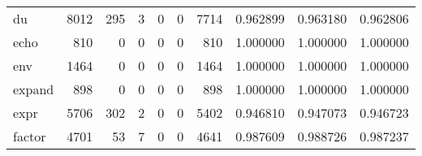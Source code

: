 \begin{tabular}{lrrrrrrrrr}
du        &                                8012 &                                             295 &                                              3 &                                             0 &                                              0 &                                         7714 &                                           0.962899 &                               0.963180 &                             0.962806 \\
echo      &                                 810 &                                               0 &                                              0 &                                             0 &                                              0 &                                          810 &                                           1.000000 &                               1.000000 &                             1.000000 \\
env       &                                1464 &                                               0 &                                              0 &                                             0 &                                              0 &                                         1464 &                                           1.000000 &                               1.000000 &                             1.000000 \\
expand    &                                 898 &                                               0 &                                              0 &                                             0 &                                              0 &                                          898 &                                           1.000000 &                               1.000000 &                             1.000000 \\
expr      &                                5706 &                                             302 &                                              2 &                                             0 &                                              0 &                                         5402 &                                           0.946810 &                               0.947073 &                             0.946723 \\
factor    &                                4701 &                                              53 &                                              7 &                                             0 &                                              0 &                                         4641 &                                           0.987609 &                               0.988726 &                             0.987237 \\

\end{tabular}
